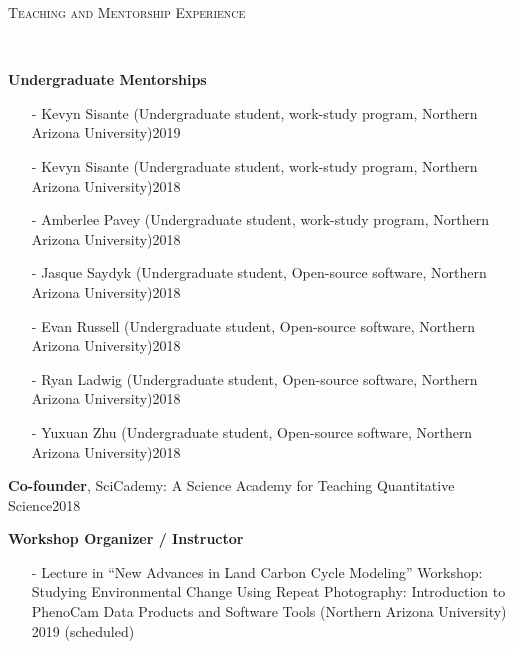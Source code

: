 \documentclass[10pt]{article}
\newenvironment{changemargin}[2]{%
  \begin{list}{}{%
    \setlength{\topsep}{0pt}%
    \setlength{\leftmargin}{#1}%
    \setlength{\rightmargin}{#2}%
    \setlength{\listparindent}{\parindent}%
    \setlength{\itemindent}{\parindent}%
    \setlength{\parsep}{\parskip}%
  }%
  \item[]}{\end{list}
}
\newcommand{\lineover}{
	\begin{changemargin}{-0.05in}{-0.05in}
		\vspace*{-8pt}
		\hrulefill \\
		\vspace*{-2pt}
	\end{changemargin}
}
\newcommand{\header}[1]{
	\begin{changemargin}{-0.5in}{-0.5in}
		\scshape{#1}\\
  	\lineover
	\end{changemargin}
}
\newenvironment{body} {
	\vspace*{-2pt}
	\begin{changemargin}{-0.5in}{-0.5in}
  }
	{\end{changemargin}
}
\begin{document}
\header{Teaching and Mentorship Experience}

\begin{body}



	\textbf{Undergraduate Mentorships}\\
		\vspace*{-4pt}
		\begin{itemize} \itemsep -0pt
  		\item[-]	Kevyn Sisante (Undergraduate student, work-study program, Northern Arizona University)\hfill {2019}\\
  		\item[-]	Kevyn Sisante (Undergraduate student, work-study program, Northern Arizona University)\hfill {2018}\\
  		\item[-]	Amberlee Pavey (Undergraduate student, work-study program, Northern Arizona University)\hfill {2018}\\
  		\item[-]	Jasque Saydyk (Undergraduate student, Open-source software, Northern Arizona University)\hfill {2018}\\
  		\item[-]	Evan Russell (Undergraduate student, Open-source software, Northern Arizona University)\hfill {2018}\\
  		\item[-]	Ryan Ladwig (Undergraduate student, Open-source software, Northern Arizona University)\hfill {2018}\\
  		\item[-]	Yuxuan Zhu (Undergraduate student, Open-source software, Northern Arizona University)\hfill {2018}\\
  	\end{itemize}

	\medskip

  	\textbf{Co-founder}, SciCademy: A Science Academy for Teaching Quantitative Science\hfill {2018}\\
	\medskip

  \textbf {Workshop Organizer / Instructor}\\
	\vspace*{-4pt}
		\begin{itemize} \itemsep -0pt
		
		
		 \item[-] Lecture in ``New Advances in Land Carbon Cycle Modeling'' Workshop: Studying Environmental Change Using Repeat Photography: Introduction to PhenoCam Data Products and Software Tools (Northern Arizona University)  \hfill {2019 (scheduled)}



\end{itemize}
\end{body}
\end{document}

